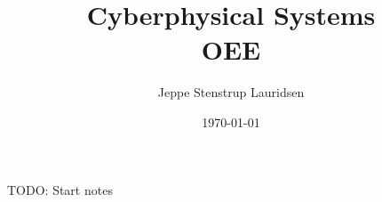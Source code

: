 \documentclass[12pt]{article}
\title{%
Cyberphysical Systems \\
\large OEE}
\author{Jeppe Stenstrup Lauridsen}
\date{\today}
\begin{document}
\begin{titlepage}
\clearpage\maketitle
\thispagestyle{empty}
\end{titlepage}

TODO: Start notes
\end{document}
